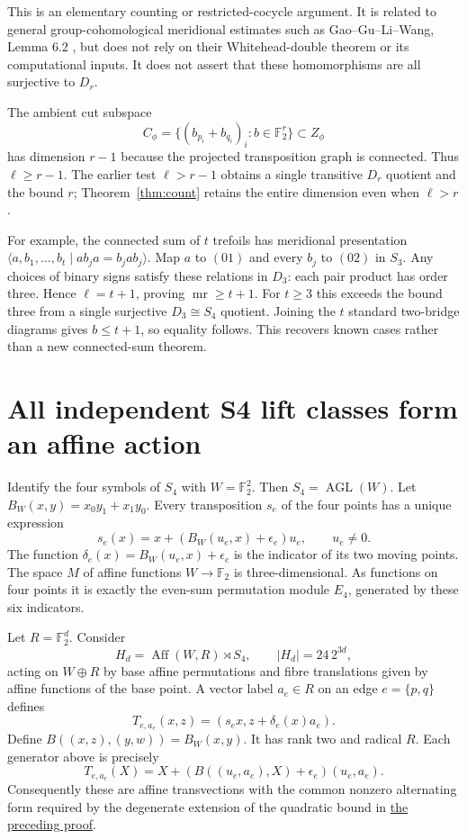 \documentclass[11pt]{article}
\newcommand{\F}{\mathbb F}
\newcommand{\mr}{\operatorname{mr}}
\begin{document}
This is an elementary counting or restricted-cocycle argument. It is
related to general group-cohomological meridional estimates such as
Gao--Gu--Li--Wang, Lemma 6.2 \cite{gglw}, but does not rely on their
Whitehead-double theorem or its computational inputs. It does not assert
that these homomorphisms are all surjective to $D_r$.

The ambient cut subspace
\[
 C_\phi=\{(b_{p_i}+b_{q_i})_i:b\in\F_2^r\}\subset Z_\phi
\]
has dimension $r-1$ because the projected transposition graph is
connected. Thus $\ell\ge r-1$. The earlier test $\ell>r-1$ obtains a
single transitive $D_r$ quotient and the bound $r$; Theorem~\ref{thm:count}
retains the entire dimension even when $\ell>r$.

For example, the connected sum of $t$ trefoils has meridional
presentation $\langle a,b_1,\ldots,b_t\mid ab_ja=b_jab_j\rangle$.
Map $a$ to $(01)$ and every $b_j$ to $(02)$ in $S_3$. Any choices of
binary signs satisfy these relations in $D_3$: each pair product has
order three. Hence $\ell=t+1$, proving $\mr\ge t+1$. For $t\ge3$ this
exceeds the bound three from a single surjective $D_3\cong S_4$ quotient.
Joining the $t$ standard
two-bridge diagrams gives $b\le t+1$, so equality follows. This recovers
known cases rather than a new connected-sum theorem.

\section{All independent S4 lift classes form an affine action}

Identify the four symbols of $S_4$ with $W=\F_2^2$.
Then $S_4=\operatorname{AGL}(W)$. Let
$B_W(x,y)=x_0y_1+x_1y_0$. Every transposition $s_e$ of the four points
has a unique expression
\[
 s_e(x)=x+(B_W(u_e,x)+\epsilon_e)u_e,\qquad u_e\ne0.
\]
The function $\delta_e(x)=B_W(u_e,x)+\epsilon_e$ is the indicator of its
two moving points. The space $M$ of affine functions $W\to\F_2$ is
three-dimensional. As functions on four points it is exactly the
even-sum permutation module $E_4$, generated by these six indicators.

Let $R=\F_2^d$. Consider
\[
 H_d=\operatorname{Aff}(W,R)\rtimes S_4,
 \qquad |H_d|=24\,2^{3d},
\]
acting on $W\oplus R$ by base affine permutations and fibre translations
given by affine functions of the base point. A vector label $a_e\in R$
on an edge $e=\{p,q\}$ defines
\[
 T_{e,a_e}(x,z)=(s_ex,z+\delta_e(x)a_e).
\]
Define $B((x,z),(y,w))=B_W(x,y)$. It has rank two and radical $R$.
Each generator above is precisely
\[
 T_{e,a_e}(X)=X+(B((u_e,a_e),X)+\epsilon_e)(u_e,a_e).    \tag{1}
\]
Consequently these are affine transvections with the common nonzero
alternating form required by the degenerate extension of the quadratic
bound in \href{PROOF.tex}{the preceding proof}.
\end{document}

